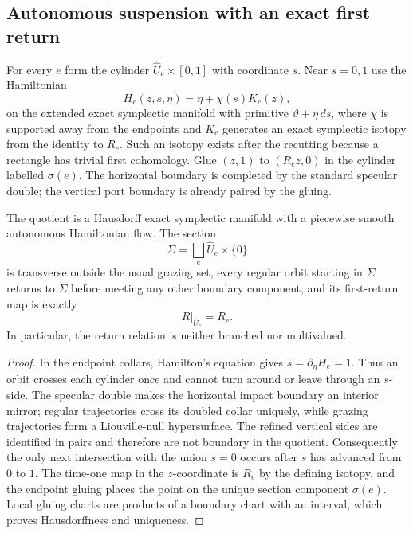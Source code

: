 \subsection{Autonomous suspension with an exact first return}

For every \(e\) form the cylinder
\(\widehat U_e\times[0,1]\) with coordinate \(s\).  Near \(s=0,1\) use the
Hamiltonian
\[
 H_e(z,s,\eta)=\eta+\chi(s)K_e(z),
\]
on the extended exact symplectic manifold with primitive
\(\vartheta+\eta\,ds\), where \(\chi\) is supported away from the endpoints
and \(K_e\) generates an exact symplectic isotopy from the identity to
\(R_e\).  Such an isotopy exists after the recutting because a rectangle has
trivial first cohomology.  Glue \((z,1)\) to \((R_ez,0)\) in the cylinder
labelled \(\sigma(e)\).  The horizontal boundary is completed by the standard
specular double; the vertical port boundary is already paired by the gluing.

\begin{theorem}
\label{thm:r5-a1-return}
The quotient is a Hausdorff exact symplectic manifold with a piecewise smooth
autonomous Hamiltonian flow.  The section
\[
 \Sigma=\bigsqcup_e\widehat U_e\times\{0\}
\]
is transverse outside the usual grazing set, every regular orbit starting in
\(\Sigma\) returns to \(\Sigma\) before meeting any other boundary component,
and its first-return map is exactly
\[
 R|_{\widehat U_e}=R_e.
\]
In particular, the return relation is neither branched nor multivalued.
\end{theorem}

\begin{proof}
In the endpoint collars, Hamilton's equation gives
\(\dot s=\partial_\eta H_e=1\).  Thus an orbit crosses each cylinder once and
cannot turn around or leave through an \(s\)-side.  The specular double makes
the horizontal impact boundary an interior mirror; regular trajectories
cross its doubled collar uniquely, while grazing trajectories form a
Liouville-null hypersurface.  The refined vertical sides are identified in
pairs and therefore are not boundary in the quotient.  Consequently the
only next intersection with the union \(s=0\) occurs after \(s\) has advanced
from \(0\) to \(1\).  The time-one map in the \(z\)-coordinate is \(R_e\) by
the defining isotopy, and the endpoint gluing places the point on the unique
section component \(\sigma(e)\).  Local gluing charts are products of a
boundary chart with an interval, which proves Hausdorffness and uniqueness.
\end{proof}

